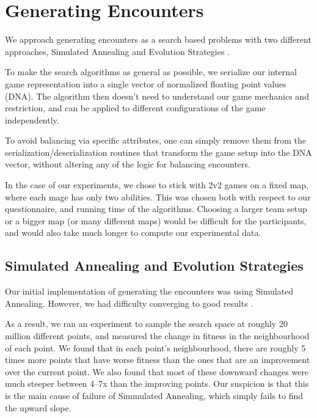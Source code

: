 \chapter{Generating Encounters}
\label{chapter04}

We approach generating encounters as a search based problems with two different
approaches, Simulated Annealing \citep{ai-modern} and Evolution Strategies
\citep{evolution-strategies}.

To make the search algorithms as general as possible, we serialize our
internal game representation into a single vector of normalized floating
point values (DNA). The algorithm then doesn't need to understand our game
mechanics and restriction, and can be applied to different configurations of
the game independently.

To avoid balancing via specific attributes, one can simply remove them from
the serialization/deserialization routines that transform the game setup into
the DNA vector, without altering any of the logic for balancing encounters.

In the case of our experiments, we chose to stick with 2v2 games on a fixed map,
where each mage has only two abilities. This was chosen both with respect to our
questionnaire, and running time of the algorithms. Choosing a larger team setup or
a bigger map (or many different maps) would be difficult for the participants,
and would also take much longer to compute our experimental data.



\section{Simulated Annealing and Evolution Strategies}

Our initial implementation of generating the encounters was using Simulated
Annealing. However, we had difficulty converging to good results .

As a result, we ran an experiment to sample the search space at roughly 20
million different points, and measured the change in fitness in the
neighbourhood of each point. We found that in each point's neighbourhood,
there are roughly 5 times more points that have worse fitness than the ones
that are an improvement over the current point. We also found that most of
these downward changes were much steeper between 4--7x than the improving
points. Our suspicion is that this is the main cause of failure of
Simmulated Annealing, which simply fails to find the upward slope.

